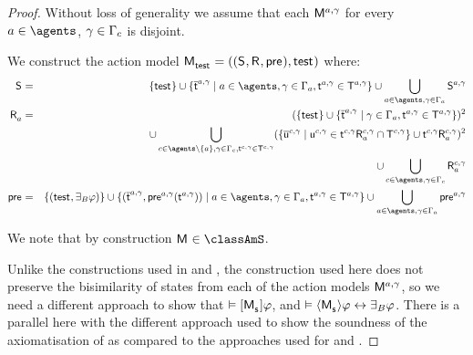 \begin{proof}
Without loss of generality we assume that each $\aModel[\agentA, \gamma]$ for every $\agentA \in \agents$, $\gamma \in \Gamma_\agentC$ is disjoint.

We construct the action model $\aPModelAndTuple{\aStateTest}$ where:
\begin{eqnarray*}
    \aStates &=& \{\aStateTest\} \cup \{\aPStateT[\agentA, \gamma] \mid \agentA \in \agents, \gamma \in \Gamma_\agentA, \aStateT[\agentA, \gamma] \in \aStatesT[\agentA, \gamma]\} \cup \bigcup_{\agentA \in \agents, \gamma \in \Gamma_\agentA} \aStates[\agentA, \gamma]\\
    \aAccessibilityA &=& (\{\aStateTest\} \cup \{\aPStateT[\agentA, \gamma] \mid \gamma \in \Gamma_\agentA, \aStateT[\agentA, \gamma] \in \aStatesT[\agentA, \gamma]\})^2\\&&\quad \cup \bigcup_{\agentC \in \agents \setminus \{\agentA\}, \gamma \in \Gamma_\agentC, \aStateT[\agentC, \gamma] \in \aStatesT[\agentC, \gamma]} (\{\aPStateU[\agentC, \gamma] \mid \aStateU[\agentC, \gamma] \in \aSuccessorsA[\agentC, \gamma]{\aStateT[\agentC, \gamma]} \cap \aStatesT[\agentC, \gamma]\} \cup \aSuccessorsA[\agentC, \gamma]{\aStateT[\agentC, \gamma]})^2 \\&&\quad\cup \bigcup_{\agentC \in \agents, \gamma \in \Gamma_\agentC} \aAccessibilityA[\agentC, \gamma]\\
    \aPrecondition &=& \{(\aStateTest, \someactsBs \phi)\} \cup \{(\aPStateT[\agentA, \gamma], \aPrecondition[\agentA, \gamma](\aStateT[\agentA, \gamma])) \mid \agentA \in \agents, \gamma \in \Gamma_\agentA, \aStateT[\agentA, \gamma] \in \aStatesT[\agentA, \gamma]\} \cup \bigcup_{\agentA \in \agents, \gamma \in \Gamma_\agentA} \aPrecondition[\agentA, \gamma]
\end{eqnarray*}

We note that by construction $\aModel \in \classAmS$.

Unlike the constructions used in \logicAamlK{} and \logicAamlKFF{}, the construction used here does not preserve the bisimilarity of states from each of the action models $\aModel[\agentA, \gamma]$, so we need a different approach to show that $\entails \actionA{\aPModel{\aStateS}} \phi$, and $\entails \actionE{\aPModel{\aStateS}} \phi \iff \someactsBs \phi$.
There is a parallel here with the different approach used to show the soundness of the axiomatisation of \logicRmlS{} as compared to the approaches used for \logicRmlK{} and \logicRmlKFF{}.



\end{proof}
